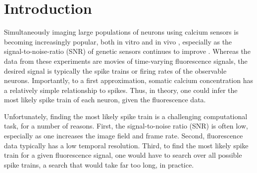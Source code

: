 \section{Introduction}


Simultaneously imaging large populations of neurons using calcium sensors is becoming increasingly popular, both in vitro  \cite{ImagingManual} and in vivo \cite{NagayamaChen07, GobelHelmchen07, LuoSvoboda08}, especially as the signal-to-noise-ratio (SNR) of genetic sensors continues to improve \cite{GaraschukKonnerth07, MankGriesbeck08, WallaceHasan08}. Whereas the data from these experiments are movies of time-varying fluorescence signals, the desired signal is typically the spike trains or firing rates of the observable neurons.  Importantly, to a first approximation, somatic calcium concentration has a relatively simple relationship to spikes.  Thus, in theory, one could infer the most likely spike train of each neuron, given the fluorescence data.  


Unfortunately, finding the most likely spike train is a challenging computational task, for a number of reasons.  First, the signal-to-noise ratio (SNR) is often low, especially as one increases the image field and frame rate.  Second, fluorescence data typically has a low temporal resolution.  Third, to find the most likely spike train for a given fluorescence signal, one would have to search over all possible spike trains, a search that would take far too long, in practice.  


